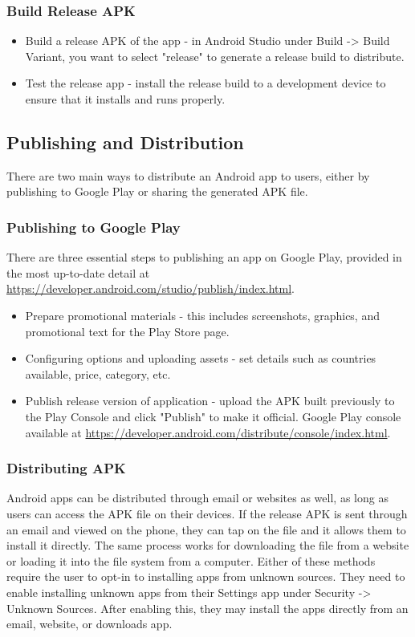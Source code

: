 \subsubsection{Build Release APK}
\begin{itemize}
    \item Build a release APK of the app - in Android Studio under Build -> Build Variant, you want to select "release" to generate a release build to distribute.
    \item Test the release app - install the release build to a development device to ensure that it installs and runs properly.
\end{itemize} 

\subsection{Publishing and Distribution}
There are two main ways to distribute an Android app to users, either by publishing to Google Play or sharing the generated APK file.
\subsubsection{Publishing to Google Play}
There are three essential steps to publishing an app on Google Play, provided in the most up-to-date detail at \url{https://developer.android.com/studio/publish/index.html}. 
\begin{itemize}
    \item Prepare promotional materials - this includes screenshots, graphics, and promotional text for the Play Store page.
    \item Configuring options and uploading assets - set details such as countries available, price, category, etc.
    \item Publish release version of application - upload the APK built previously to the Play Console and click "Publish" to make it official. Google Play console available at \url{https://developer.android.com/distribute/console/index.html}.
\end{itemize}
\subsubsection{Distributing APK}
Android apps can be distributed through email or websites as well, as long as users can access the APK file on their devices. If the release APK is sent through an email and viewed on the phone, they can tap on the file and it allows them to install it directly. The same process works for downloading the file from a website or loading it into the file system from a computer. Either of these methods require the user to opt-in to installing apps from unknown sources. They need to enable installing unknown apps from their Settings app under Security -> Unknown Sources. After enabling this, they may install the apps directly from an email, website, or downloads app.